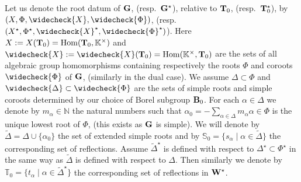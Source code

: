 \documentclass[eqthmnum]{jt-calcs}
\begin{document}
\begin{pa}\label{pa:root-data}
Let us denote the root datum of $\mathbf{G}$, (resp.\ $\mathbf{G}^{\star}$), relative to $\mathbf{T}_0$, (resp.\ $\mathbf{T}_0^{\star}$), by $(X,\Phi,\widecheck{X},\widecheck{\Phi})$, (resp.\ $(X^{\star},\Phi^{\star},\widecheck{X}^{\star},\widecheck{\Phi}^{\star})$). Here $X := X(\mathbf{T}_0) = \operatorname{Hom}(\mathbf{T}_0,\mathbb{K}^{\times})$ and $\widecheck{X} := \widecheck{X}(\bT_0) = \Hom(\mathbb{K}^{\times},\bT_0)$ are the sets of all algebraic group homomorphisms containing respectively the roots $\Phi$ and coroots $\widecheck{\Phi}$ of $\mathbf{G}$, (similarly in the dual case). We assume $\Delta \subset \Phi$ and $\widecheck{\Delta} \subset \widecheck{\Phi}$ are the sets of simple roots and simple coroots determined by our choice of Borel subgroup $\mathbf{B}_0$. For each $\alpha \in \Delta$ we denote by $m_{\alpha} \in \mathbb{N}$ the natural numbers such that $\alpha_0 = - \sum_{\alpha \in \Delta} m_{\alpha}\alpha \in \Phi$ is the unique lowest root of $\Phi$, (this exists as $\mathbf{G}$ is simple). We will denote by $\tilde{\Delta} = \Delta \cup \{\alpha_0\}$ the set of extended simple roots and by $\mathbb{S}_0 = \{s_{\alpha} \mid \alpha\in\tilde{\Delta}\}$ the corresponding set of reflections. Assume $\tilde{\Delta}^{\star}$ is defined with respect to $\Delta^{\star} \subset \Phi^{\star}$ in the same way as $\tilde{\Delta}$ is defined with respect to $\Delta$. Then similarly we denote by $\mathbb{T}_0 = \{t_{\alpha} \mid \alpha \in \widetilde{\Delta}^{\star}\}$ the corresponding set of reflections in $\mathbf{W}^{\star}$.


\end{pa}
\end{document}

